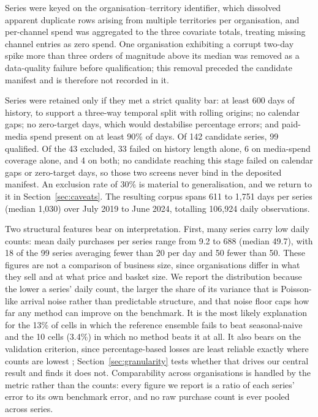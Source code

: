 \documentclass[11pt]{article}
\begin{document}
Series were keyed on the organisation--territory identifier, which dissolved apparent duplicate rows arising from multiple territories per organisation, and per-channel spend was aggregated to the three covariate totals, treating missing channel entries as zero spend. One organisation exhibiting a corrupt two-day spike more than three orders of magnitude above its median was removed as a data-quality failure before qualification; this removal preceded the candidate manifest and is therefore not recorded in it.

Series were retained only if they met a strict quality bar: at least 600 days of history, to support a three-way temporal split with rolling origins; no calendar gaps; no zero-target days, which would destabilise percentage errors; and paid-media spend present on at least 90\% of days. Of 142 candidate series, 99 qualified. Of the 43 excluded, 33 failed on history length alone, 6 on media-spend coverage alone, and 4 on both; no candidate reaching this stage failed on calendar gaps or zero-target days, so those two screens never bind in the deposited manifest. An exclusion rate of 30\% is material to generalisation, and we return to it in Section~\ref{sec:caveats}. The resulting corpus spans 611 to 1,751 days per series (median 1,030) over July 2019 to June 2024, totalling 106,924 daily observations.

Two structural features bear on interpretation. First, many series carry low daily counts: mean daily purchases per series range from 9.2 to 688 (median 49.7), with 18 of the 99 series averaging fewer than 20 per day and 50 fewer than 50. These figures are not a comparison of business size, since organisations differ in what they sell and at what price and basket size. We report the distribution because the lower a series' daily count, the larger the share of its variance that is Poisson-like arrival noise rather than predictable structure, and that noise floor caps how far any method can improve on the benchmark. It is the most likely explanation for the 13\% of cells in which the reference ensemble fails to beat seasonal-naive and the 10 cells (3.4\%) in which no method beats it at all. It also bears on the validation criterion, since percentage-based losses are least reliable exactly where counts are lowest \citep{kolassa2016}; Section~\ref{sec:granularity} tests whether that drives our central result and finds it does not. Comparability across organisations is handled by the metric rather than the counts: every figure we report is a ratio of each series' error to its own benchmark error, and no raw purchase count is ever pooled across series.
\end{document}
